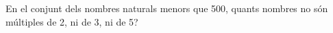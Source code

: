 \begin{enumerate}
\begin{enumerate}
\end{enumerate}
\feedback

\pregunta En el conjunt dels nombres naturals menors que 500, %
quants nombres no són múltiples de 2, ni de 3, ni de 5?

\begin{enumerate}
\end{enumerate}
\feedback
\end{enumerate}

